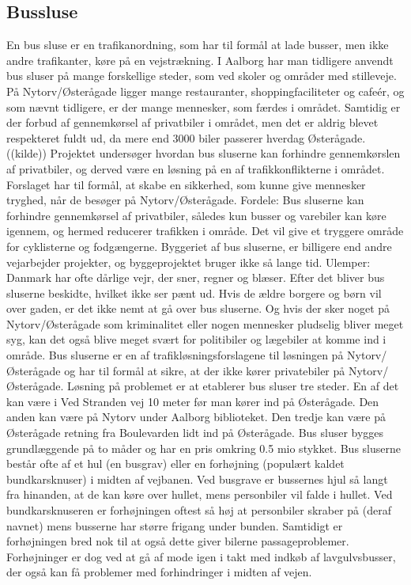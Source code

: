 \subsection{Bussluse}
\label{bussluse}

En bus sluse er en trafikanordning, som har til formål at lade busser, men ikke andre trafikanter, køre på en vejstrækning. 
I Aalborg har man tidligere anvendt bus sluser på mange forskellige steder, som ved skoler og områder med stilleveje. På Nytorv/Østerågade ligger mange restauranter, shoppingfaciliteter og cafeér, og som nævnt tidligere, er der mange mennesker, som færdes i området. Samtidig er der forbud af gennemkørsel af privatbiler i området, men det er aldrig blevet respekteret fuldt ud, da mere end 3000 biler passerer hverdag Østerågade. ((kilde))
Projektet undersøger hvordan bus sluserne kan forhindre gennemkørslen af privatbiler, og derved være en løsning på en af trafikkonflikterne i området. Forslaget har til formål, at  skabe en sikkerhed, som kunne give mennesker tryghed, når de besøger på Nytorv/Østerågade.      
Fordele: Bus sluserne kan forhindre gennemkørsel af privatbiler, således kun busser og varebiler kan køre igennem, og hermed reducerer trafikken i område. Det vil give et tryggere område for cyklisterne og fodgængerne. Byggeriet af bus sluserne, er billigere end andre vejarbejder projekter, og byggeprojektet bruger ikke så lange tid.   
Ulemper: Danmark har ofte dårlige vejr, der sner, regner og blæser. Efter det bliver bus sluserne beskidte, hvilket ikke ser pænt ud. Hvis de ældre borgere og børn vil over gaden, er det ikke nemt at gå over bus sluserne. Og hvis der sker noget på Nytorv/Østerågade som kriminalitet eller nogen mennesker pludselig bliver meget syg, kan det også blive meget svært for politibiler og lægebiler at komme ind i område.   
Bus sluserne er en af trafikløsningsforslagene til løsningen på Nytorv/Østerågade og har til formål at sikre, at der ikke kører privatebiler på Nytorv/Østerågade. Løsning på problemet er at etablerer bus sluser tre steder. En af det kan være i Ved Stranden vej 10 meter før man kører ind på Østerågade. Den anden kan være på Nytorv under Aalborg biblioteket. Den tredje kan være på Østerågade retning fra Boulevarden lidt ind på Østerågade.  
Bus sluser bygges grundlæggende på to måder og har en pris omkring 0.5 mio stykket. 
Bus sluserne består ofte af et hul (en busgrav) eller en forhøjning (populært kaldet bundkarsknuser) i midten af vejbanen. Ved busgrave er bussernes hjul så langt fra hinanden, at de kan køre over hullet, mens personbiler vil falde i hullet. Ved bundkarsknuseren er forhøjningen oftest så høj at personbiler skraber på (deraf navnet) mens busserne har større frigang under bunden. Samtidigt er forhøjningen bred nok til at også dette giver bilerne passageproblemer. Forhøjninger er dog ved at gå af mode igen i takt med indkøb af lavgulvsbusser, der også kan få problemer med forhindringer i midten af vejen.
